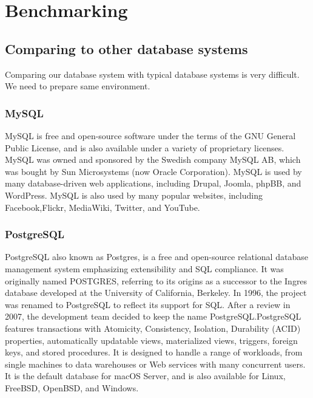 \chapter{Benchmarking}

\section{Comparing to other database systems}
Comparing our database system with typical database systems is very difficult. We need to prepare same environment.

\subsection{MySQL}
MySQL is free and open-source software under the terms of the GNU General Public License, and is also available under a variety of proprietary licenses. MySQL was owned and sponsored by the Swedish company MySQL AB, which was bought by Sun Microsystems (now Oracle Corporation). MySQL is used by many database-driven web applications, including Drupal, Joomla, phpBB, and WordPress. MySQL is also used by many popular websites, including Facebook,Flickr, MediaWiki, Twitter, and YouTube.

\subsection{PostgreSQL}
PostgreSQL also known as Postgres, is a free and open-source relational database management system emphasizing extensibility and SQL compliance. It was originally named POSTGRES, referring to its origins as a successor to the Ingres database developed at the University of California, Berkeley. In 1996, the project was renamed to PostgreSQL to reflect its support for SQL. After a review in 2007, the development team decided to keep the name PostgreSQL.PostgreSQL features transactions with Atomicity, Consistency, Isolation, Durability (ACID) properties, automatically updatable views, materialized views, triggers, foreign keys, and stored procedures. It is designed to handle a range of workloads, from single machines to data warehouses or Web services with many concurrent users. It is the default database for macOS Server, and is also available for Linux, FreeBSD, OpenBSD, and Windows.

